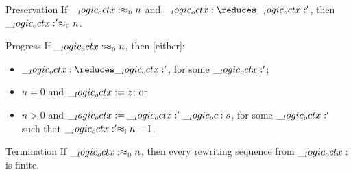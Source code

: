 \begin{theorem}
  \leavevmode
  \begin{thmdescription}
  \item[Preservation]
    If $\__logic_octx: \approx\sb{\text{\normalfont\scshape d}} n$ and $\octx \reduces \octx'$, then $\__logic_octx:' \approx\sb{\text{\normalfont\scshape d}} n$.
  \item[Progress]
    If $\__logic_octx: \approx\sb{\text{\normalfont\scshape d}} n$, then [either]:
    \begin{itemize}[nosep]
    \item $\octx \reduces \octx'$, for some $\__logic_octx:'$;
    \item $n = 0$ and $\__logic_octx: = z$; or
    \item $n > 0$ and $\__logic_octx: = \__logic_octx:' \__logic_oc: s$, for some $\__logic_octx:'$ such that $\__logic_octx:' \approx\sb{\text{\normalfont\scshape i}} n-1$.
    \end{itemize}
  \item[Termination]
    If $\__logic_octx: \approx\sb{\text{\normalfont\scshape d}} n$, then every rewriting sequence from $\__logic_octx:$ is finite.
  \end{thmdescription}
\end{theorem}
